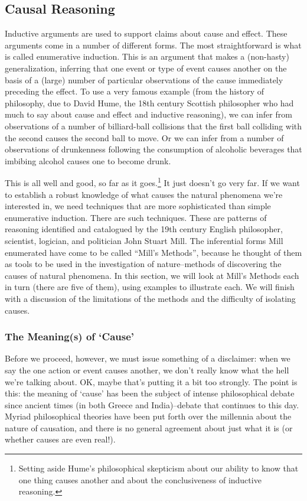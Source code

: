 \subsection{Causal Reasoning}
Inductive arguments are used to support claims about cause and effect. These arguments come in
a number of different forms. The most straightforward is what is called enumerative induction.
This is an argument that makes a (non-hasty) generalization, inferring that one event or type of
event causes another on the basis of a (large) number of particular observations of the cause
immediately preceding the effect. To use a very famous example (from the history of philosophy,
due to David Hume, the 18th century Scottish philosopher who had much to say about cause and
effect and inductive reasoning), we can infer from observations of a number of billiard-ball
collisions that the first ball colliding with the second causes the second ball to move. Or we can
infer from a number of observations of drunkenness following the consumption of alcoholic
beverages that imbibing alcohol causes one to become drunk.

This is all well and good, so far as it 
goes.\footnote{Setting aside Hume's philosophical skepticism about our ability to know that one thing 
causes another and about the
conclusiveness of inductive reasoning.}
It just doesn't go very far. If we want to establish a
robust knowledge of what causes the natural phenomena we're interested in, we need techniques
that are more sophisticated than simple enumerative induction. There are such techniques. These
are patterns of reasoning identified and catalogued by the 19th century English philosopher,
scientist, logician, and politician John Stuart Mill. The inferential forms Mill enumerated have
come to be called ``Mill's Methods'', because he thought of them as tools to be used in the
investigation of nature--methods of discovering the causes of natural phenomena. In this section,
we will look at Mill's Methods each in turn (there are five of them), using examples to illustrate
each. We will finish with a discussion of the limitations of the methods and the difficulty of
isolating causes.

\subsubsection{The Meaning(s) of `Cause'}
Before we proceed, however, we must issue something of a disclaimer: when we say the one action
or event causes another, we don't really know what the hell we're talking about. OK, maybe that's
putting it a bit too strongly. The point is this: the meaning of `cause' has been the subject of intense
philosophical debate since ancient times (in both Greece and India)--debate that continues to this
day. Myriad philosophical theories have been put forth over the millennia about the nature of
causation, and there is no general agreement about just what it is (or whether causes are even real!).

